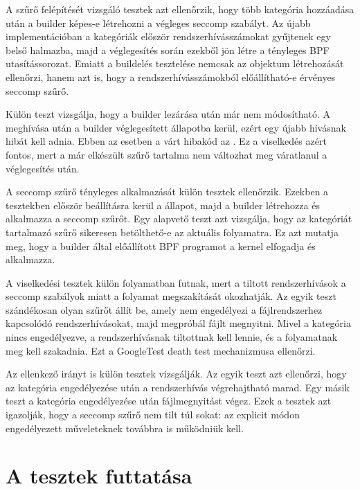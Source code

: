 A szűrő felépítését vizsgáló tesztek azt ellenőrzik, hogy több kategória
hozzáadása után a builder képes-e létrehozni a végleges seccomp szabályt. Az
újabb implementációban a kategóriák először rendszerhívásszámokat gyűjtenek egy
belső halmazba, majd a véglegesítés során ezekből jön létre a tényleges BPF
utasítássorozat. Emiatt a buildelés tesztelése nemcsak az objektum létrehozását
ellenőrzi, hanem azt is, hogy a rendszerhívásszámokból előállítható-e érvényes
seccomp szűrő.

Külön teszt vizsgálja, hogy a builder lezárása után már nem módosítható. A
 meghívása után a builder véglegesített állapotba kerül, ezért egy
újabb  hívásnak hibát kell adnia. Ebben az esetben a várt hibakód az
. Ez a viselkedés azért fontos, mert a már elkészült szűrő
tartalma nem változhat meg váratlanul a véglegesítés után.

A seccomp szűrő tényleges alkalmazását külön tesztek ellenőrzik. Ezekben a
tesztekben először beállításra kerül a
 állapot, majd a builder létrehozza
és alkalmazza a seccomp szűrőt. Egy alapvető teszt azt vizsgálja, hogy az
 kategóriát tartalmazó szűrő sikeresen betölthető-e az aktuális
folyamatra. Ez azt mutatja meg, hogy a builder által előállított BPF programot a
kernel elfogadja és alkalmazza.

A viselkedési tesztek külön folyamatban futnak, mert a tiltott rendszerhívások
a seccomp szabályok miatt a folyamat megszakítását okozhatják. Az egyik teszt
szándékosan olyan szűrőt állít be, amely nem engedélyezi a fájlrendszerhez
kapcsolódó rendszerhívásokat, majd megpróbál fájlt megnyitni. Mivel a
 kategória nincs engedélyezve, a rendszerhívásnak
tiltottnak kell lennie, és a folyamatnak meg kell szakadnia. Ezt a GoogleTest
death test mechanizmusa ellenőrzi.

Az ellenkező irányt is külön tesztek vizsgálják. Az egyik teszt azt ellenőrzi,
hogy az  kategória engedélyezése után a  rendszerhívás
végrehajtható marad. Egy másik teszt a
 kategória engedélyezése után fájlmegnyitást
végez. Ezek a tesztek azt igazolják, hogy a seccomp szűrő nem tilt túl sokat:
az explicit módon engedélyezett műveleteknek továbbra is működniük kell.

\section{A tesztek futtatása}

